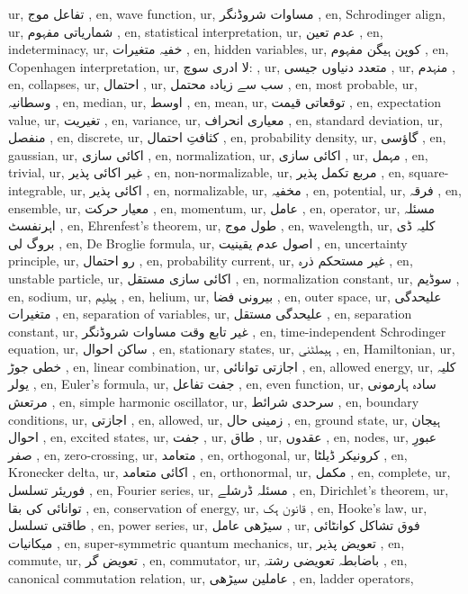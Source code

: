 ur, تفاعل موج ,
en, wave function,
ur, مساوات شروڈنگر ,
en, Schrodinger align,
ur, شماریاتی مفہوم ,
en, statistical interpretation,
ur, عدم تعین ,
en, indeterminacy,
ur, خفیہ متغیرات ,
en, hidden variables,
ur, کوپن ہیگن مفہوم ,
en, Copenhagen interpretation,
ur, لا ادری سوچ:  ,
ur, متعدد دنیاوں جیسی ,
ur, منہدم ,
en, collapses,
ur, احتمال ,
ur, سب سے زیادہ محتمل ,
en, most probable,
ur, وسطانیہ ,
en, median,
ur, اوسط ,
en, mean,
ur, توقعاتی قیمت ,
en, expectation value,
ur, تغیریت ,
en, variance,
ur, معیاری انحراف ,
en, standard deviation,
ur, منفصل ,
en, discrete,
ur, کثافتِ احتمال ,
en, probability density,
ur, گاؤسی  ,
en, gaussian,
ur, اکائی سازی ,
en, normalization,
ur,  اکائی سازی ,
ur, مہمل  ,
en, trivial,
ur, غیر اکائی پذیر ,
en, non-normalizable,
ur, مربع تکمل پذیر ,
en, square-integrable,
ur, اکائی پذیر ,
en, normalizable,
ur, مخفیہ ,
en, potential,
ur, فرقہ ,
en, ensemble,
ur, معیار حرکت ,
en, momentum,
ur, عامل ,
en, operator,
ur, مسئلہ اہرنفسٹ ,
en, Ehrenfest's theorem,
ur, طول موج ,
en, wavelength,
ur, کلیہ ڈی بروگ لی ,
en, De Broglie formula,
ur, اصول عدم یقینیت ,
en, uncertainty principle,
ur, رو احتمال  ,
en, probability current,
ur, غیر مستحکم ذرہ ,
en, unstable particle,
ur, اکائی سازی مستقل ,
en, normalization constant,
ur,  سوڈیم ,
en, sodium,
ur, ہیلیم ,
en, helium,
ur, بیرونی فضا ,
en, outer space,
ur, علیحدگی متغیرات ,
en, separation of variables,
ur,  علیحدگی مستقل ,
en, separation constant,
ur, غیر تابع وقت مساوات شروڈنگر ,
en, time-independent Schrodinger equation,
ur, ساکن احوال ,
en, stationary states,
ur, ہیملٹنی ,
en, Hamiltonian,
ur, خطی جوڑ ,
en, linear combination,
ur, اجازتی توانائی ,
en, allowed energy,
ur, کلیہ یولر ,
en, Euler's formula,
ur, جفت تفاعل ,
en, even function,
ur, سادہ ہارمونی مرتعش ,
en, simple harmonic oscillator,
ur, سرحدی شرائط ,
en, boundary conditions,
ur, اجازتی ,
en, allowed,
ur, زمینی حال ,
en, ground state,
ur, ہیجان احوال ,
en, excited states,
ur, جفت ,
ur, طاق ,
ur, عقدوں ,
en, nodes,
ur, عبورِ صفر ,
en, zero-crossing,
ur, متعامد ,
en, orthogonal,
ur, کرونیکر ڈیلٹا ,
en, Kronecker delta,
ur, اکائی متعامد ,
en, orthonormal,
ur, مکمل ,
en, complete,
ur, فوریئر تسلسل ,
en, Fourier series,
ur, مسئلہ ڈرشلے ,
en, Dirichlet's theorem,
ur,  توانائی کی بقا ,
en, conservation of energy,
ur, قانون ہک ,
en, Hooke's law,
ur, طاقتی تسلسل ,
en, power series,
ur, سیڑھی عامل ,
ur, فوق تشاکل کوانٹائی میکانیات ,
en, super-symmetric quantum mechanics,
ur, تعویض پذیر ,
en, commute,
ur, تعویض گر ,
en, commutator,
ur, باضابطہ تعویضی رشتہ ,
en, canonical commutation relation,
ur, عاملین سیڑھی ,
en, ladder operators,
